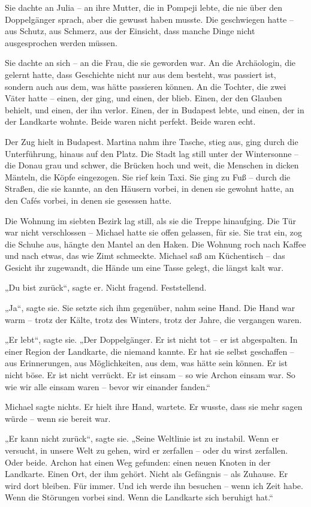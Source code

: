 \documentclass[
]{article}
\begin{document}
Sie dachte an Julia -- an ihre Mutter, die in Pompeji lebte, die nie über den Doppelgänger sprach, aber die gewusst haben musste. Die geschwiegen hatte -- aus Schutz, aus Schmerz, aus der Einsicht, dass manche Dinge nicht ausgesprochen werden müssen.

Sie dachte an sich -- an die Frau, die sie geworden war. An die Archäologin, die gelernt hatte, dass Geschichte nicht nur aus dem besteht, was passiert ist, sondern auch aus dem, was hätte passieren können. An die Tochter, die zwei Väter hatte -- einen, der ging, und einen, der blieb. Einen, der den Glauben behielt, und einen, der ihn verlor. Einen, der in Budapest lebte, und einen, der in der Landkarte wohnte. Beide waren nicht perfekt. Beide waren echt.

Der Zug hielt in Budapest. Martina nahm ihre Tasche, stieg aus, ging durch die Unterführung, hinaus auf den Platz. Die Stadt lag still unter der Wintersonne -- die Donau grau und schwer, die Brücken hoch und weit, die Menschen in dicken Mänteln, die Köpfe eingezogen. Sie rief kein Taxi. Sie ging zu Fuß -- durch die Straßen, die sie kannte, an den Häusern vorbei, in denen sie gewohnt hatte, an den Cafés vorbei, in denen sie gesessen hatte.

Die Wohnung im siebten Bezirk lag still, als sie die Treppe hinaufging. Die Tür war nicht verschlossen -- Michael hatte sie offen gelassen, für sie. Sie trat ein, zog die Schuhe aus, hängte den Mantel an den Haken. Die Wohnung roch nach Kaffee und nach etwas, das wie Zimt schmeckte. Michael saß am Küchentisch -- das Gesicht ihr zugewandt, die Hände um eine Tasse gelegt, die längst kalt war.

„Du bist zurück``, sagte er. Nicht fragend. Feststellend.

„Ja``, sagte sie. Sie setzte sich ihm gegenüber, nahm seine Hand. Die Hand war warm -- trotz der Kälte, trotz des Winters, trotz der Jahre, die vergangen waren.

„Er lebt``, sagte sie. „Der Doppelgänger. Er ist nicht tot -- er ist abgespalten. In einer Region der Landkarte, die niemand kannte. Er hat sie selbst geschaffen -- aus Erinnerungen, aus Möglichkeiten, aus dem, was hätte sein können. Er ist nicht böse. Er ist nicht verrückt. Er ist einsam -- so wie Archon einsam war. So wie wir alle einsam waren -- bevor wir einander fanden.``

Michael sagte nichts. Er hielt ihre Hand, wartete. Er wusste, dass sie mehr sagen würde -- wenn sie bereit war.

„Er kann nicht zurück``, sagte sie. „Seine Weltlinie ist zu instabil. Wenn er versucht, in unsere Welt zu gehen, wird er zerfallen -- oder du wirst zerfallen. Oder beide. Archon hat einen Weg gefunden: einen neuen Knoten in der Landkarte. Einen Ort, der ihm gehört. Nicht als Gefängnis -- als Zuhause. Er wird dort bleiben. Für immer. Und ich werde ihn besuchen -- wenn ich Zeit habe. Wenn die Störungen vorbei sind. Wenn die Landkarte sich beruhigt hat.``
\end{document}
